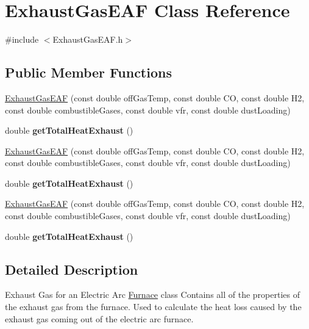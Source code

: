 \hypertarget{class_exhaust_gas_e_a_f}{}\section{Exhaust\+Gas\+E\+AF Class Reference}
\label{class_exhaust_gas_e_a_f}


{\ttfamily \#include $<$Exhaust\+Gas\+E\+A\+F.\+h$>$}

\subsection*{Public Member Functions}
\begin{DoxyCompactItemize}
\item 
\hyperlink{class_exhaust_gas_e_a_f_a500eba1e0016803cb94485594354f36a}{Exhaust\+Gas\+E\+AF} (const double off\+Gas\+Temp, const double CO, const double H2, const double combustible\+Gases, const double vfr, const double dust\+Loading)
\item 
\mbox{\label{class_exhaust_gas_e_a_f_a5f6442dab618e142b4ce43fcfb11d0cb}} 
double {\bfseries get\+Total\+Heat\+Exhaust} ()
\item 
\hyperlink{class_exhaust_gas_e_a_f_a500eba1e0016803cb94485594354f36a}{Exhaust\+Gas\+E\+AF} (const double off\+Gas\+Temp, const double CO, const double H2, const double combustible\+Gases, const double vfr, const double dust\+Loading)
\item 
\mbox{\label{class_exhaust_gas_e_a_f_a5f6442dab618e142b4ce43fcfb11d0cb}} 
double {\bfseries get\+Total\+Heat\+Exhaust} ()
\item 
\hyperlink{class_exhaust_gas_e_a_f_a500eba1e0016803cb94485594354f36a}{Exhaust\+Gas\+E\+AF} (const double off\+Gas\+Temp, const double CO, const double H2, const double combustible\+Gases, const double vfr, const double dust\+Loading)
\item 
\mbox{\label{class_exhaust_gas_e_a_f_a5f6442dab618e142b4ce43fcfb11d0cb}} 
double {\bfseries get\+Total\+Heat\+Exhaust} ()
\end{DoxyCompactItemize}


\subsection{Detailed Description}
Exhaust Gas for an Electric Arc \hyperlink{class_furnace}{Furnace} class Contains all of the properties of the exhaust gas from the furnace. Used to calculate the heat loss caused by the exhaust gas coming out of the electric arc furnace. 

